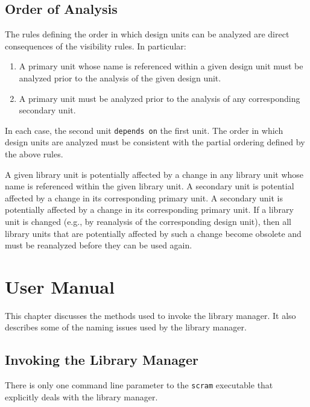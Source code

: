\documentclass[11pt]{report}
\begin{document}
\section{Order of Analysis}

The rules defining the order in which design units can be analyzed are
direct consequences of the visibility rules.  In particular:

\begin{enumerate}

\item
A primary unit whose name is referenced within a given design unit must be
analyzed prior to the analysis of the given design unit.

\item
A primary unit must be analyzed prior to the analysis of any corresponding
secondary unit.

\end{enumerate}

In each case, the second unit \texttt{depends on} the first unit.  The
order in which design units are analyzed must be consistent with the
partial ordering defined by the above rules.

A given library unit is potentially affected by a change in any library
unit whose name is referenced within the given library unit.  A secondary
unit is potential affected by a change in its corresponding primary unit.
A secondary unit is potentially affected by a change in its corresponding
primary unit.  If a library unit is changed (e.g., by reanalysis of the
corresponding design unit), then all library units that are potentially
affected by such a change become obsolete and must be reanalyzed before
they can be used again.

\chapter{User Manual}

This chapter discusses the methods used to invoke the library manager.  It
also describes some of the naming issues used by the library manager.

\section{Invoking the Library Manager}

There is only one command line parameter to the \texttt{scram} executable
that explicitly deals with the library manager.
\end{document}
